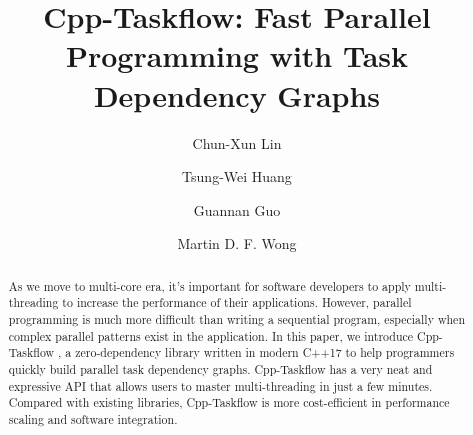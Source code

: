 \documentclass[sigconf]{acmart}
\begin{document}
\sloppy

\fancyhead{}
\title{Cpp-Taskflow: Fast Parallel Programming with Task Dependency Graphs}



\author{Chun-Xun Lin}
%
\author{Tsung-Wei Huang}
\authornotemark[1]
%
\author{Guannan Guo}
%
\author{Martin D. F. Wong}





\begin{abstract}
As we move to multi-core era, 
it's important for software developers to apply multi-threading to 
increase the performance of their applications.
However, parallel programming is much more difficult than writing a sequential program, 
especially when complex parallel patterns exist in the application. 
In this paper, we introduce Cpp-Taskflow \cite{cpp-taskflow}, a zero-dependency library 
written in modern C++17 to help programmers 
quickly build parallel task dependency graphs.
Cpp-Taskflow has a very neat and expressive API that allows users to master multi-threading 
in just a few minutes.
Compared with existing libraries, Cpp-Taskflow is more cost-efficient 
in performance scaling and software integration.




\end{abstract}


\maketitle
\end{document}
